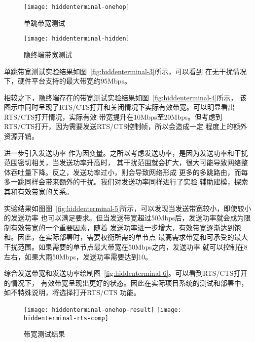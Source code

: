 \begin{figure}[H] %
  \centering
  \texttt{[image: hiddenterminal-onehop]}
  \caption{单跳带宽测试}
  \label{fig:hiddenterminal-1}
\end{figure}
\begin{figure}[H] %
  \centering
  \texttt{[image: hiddenterminal-hidden]}
  \caption{隐终端带宽测试}
  \label{fig:hiddenterminal-2}
\end{figure}

单跳带宽测试实验结果如图~\ref{fig:hiddenterminal-3}所示，可以看到
在无干扰情况下，硬件平台支持的最大带宽约95Mbps。

相较之下，隐终端存在的带宽测试实验结果如图~\ref{fig:hiddenterminal-4}所示，
该图示中同时呈现了RTS/CTS打开和关闭情况下实际有效带宽。可以明显看出RTS/CTS打开情况，实际有效
带宽提升在10Mbps至20Mbps。但考虑到RTS/CTS打开，因为需要发送RTS/CTS控制帧，所以会造成一定
程度上的额外资源开销。

进一步引入发送功率
作为因变量。之所以考虑发送功率，是因为发送功率和干扰范围密切相关，当发送功率升高时，
其干扰范围就会扩大，很大可能导致网络整体吞吐量下降。反之，发送功率过小，则会导致网络形成
更多的多跳路由，而每多一跳同样会带来额外的干扰。我们对发送功率同样进行了实验
辅助建模，探索其和有效带宽的关系。

实验结果如图图~\ref{fig:hiddenterminal-5}所示，可以发现当发送带宽较小，即使较小的发送功率
也可以满足要求。但当发送带宽超过50Mbps后，发送功率就会成为限制有效带宽的一个重要因素，随着
发送功率进一步增大，有效带宽逐渐达到饱和。因此，在实际部署时，需要权衡所需的单节点
最高需求带宽和可承受的最大干扰范围。如果需要的单节点最大带宽在50Mbps之内，发送功率
就可以控制在8左右，如果大雨50Mbps，发送功率需要达到10。

综合发送带宽和发送功率绘制图~\ref{fig:hiddenterminal-6}。可以看到RTS/CTS打开的情况下，
有效带宽呈现出更好的状态。因此在实际项目系统的测试和部署中，如不特殊说明，将选择打开RTS/CTS
功能。

\begin{figure}[h]
  \centering
      {\texttt{[image: hiddenterminal-onehop-result]}}
  \hspace{1em}
    {\texttt{[image: hiddenterminal-rts-comp]}}
  \caption{带宽测试结果}
\end{figure}

